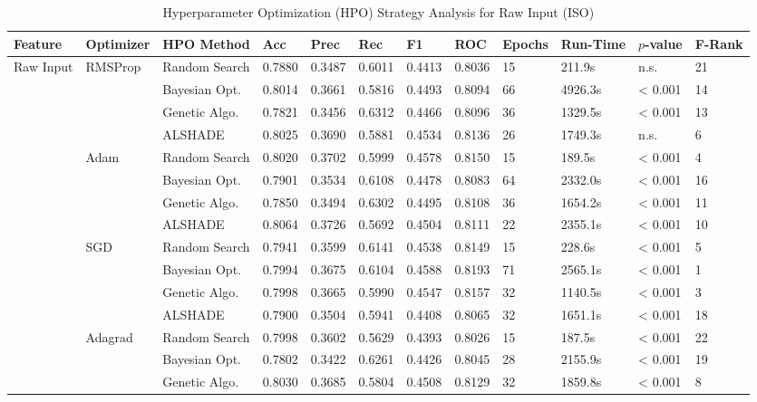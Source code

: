 \documentclass[conference]{IEEEtran}
\begin{document}
\begin{table}[t]
\centering
\scriptsize
\caption{Hyperparameter Optimization (HPO) Strategy Analysis for Raw Input (ISO)}
\label{tab:opt_raw_iso}
\begin{tabular}{llllllllllll}
\toprule 
\textbf{Feature} & \textbf{Optimizer} & \textbf{HPO Method} & \textbf{Acc} & \textbf{Prec} & \textbf{Rec} & \textbf{F1} & \textbf{ROC} & \textbf{Epochs} & \textbf{Run-Time} & \textbf{$p$-value} & \textbf{F-Rank}  \\
\midrule
\multirow{24}{*}{ Raw Input} & \multirow{4}{*}{ RMSProp} & Random Search & 0.7880 & 0.3487 & 0.6011 & 0.4413 & 0.8036 & 15 & 211.9s & n.s. & 21 \\
 &  & Bayesian Opt. & 0.8014 & 0.3661 & 0.5816 & 0.4493 & 0.8094 & 66 & 4926.3s & < 0.001 & 14 \\
 &  & Genetic Algo. & 0.7821 & 0.3456 & 0.6312 & 0.4466 & 0.8096 & 36 & 1329.5s & < 0.001 & 13 \\
 &  & ALSHADE & 0.8025 & 0.3690 & 0.5881 & 0.4534 & 0.8136 & 26 & 1749.3s & n.s. & 6 \\
\cline{2-12}
 & \multirow{4}{*}{ Adam} & Random Search & 0.8020 & 0.3702 & 0.5999 & 0.4578 & 0.8150 & 15 & 189.5s & < 0.001 & 4 \\
 &  & Bayesian Opt. & 0.7901 & 0.3534 & 0.6108 & 0.4478 & 0.8083 & 64 & 2332.0s & < 0.001 & 16 \\
 &  & Genetic Algo. & 0.7850 & 0.3494 & 0.6302 & 0.4495 & 0.8108 & 36 & 1654.2s & < 0.001 & 11 \\
 &  & ALSHADE & 0.8064 & 0.3726 & 0.5692 & 0.4504 & 0.8111 & 22 & 2355.1s & < 0.001 & 10 \\
\cline{2-12}
 & \multirow{4}{*}{ SGD} & Random Search & 0.7941 & 0.3599 & 0.6141 & 0.4538 & 0.8149 & 15 & 228.6s & < 0.001 & 5 \\
 &  & Bayesian Opt. & 0.7994 & 0.3675 & 0.6104 & 0.4588 & 0.8193 & 71 & 2565.1s & < 0.001 & 1 \\
 &  & Genetic Algo. & 0.7998 & 0.3665 & 0.5990 & 0.4547 & 0.8157 & 32 & 1140.5s & < 0.001 & 3 \\
 &  & ALSHADE & 0.7900 & 0.3504 & 0.5941 & 0.4408 & 0.8065 & 32 & 1651.1s & < 0.001 & 18 \\
\cline{2-12}
 & \multirow{4}{*}{ Adagrad} & Random Search & 0.7998 & 0.3602 & 0.5629 & 0.4393 & 0.8026 & 15 & 187.5s & < 0.001 & 22 \\
 &  & Bayesian Opt. & 0.7802 & 0.3422 & 0.6261 & 0.4426 & 0.8045 & 28 & 2155.9s & < 0.001 & 19 \\
 &  & Genetic Algo. & 0.8030 & 0.3685 & 0.5804 & 0.4508 & 0.8129 & 32 & 1859.8s & < 0.001 & 8 \\

\end{tabular}
\end{table}
\end{document}
